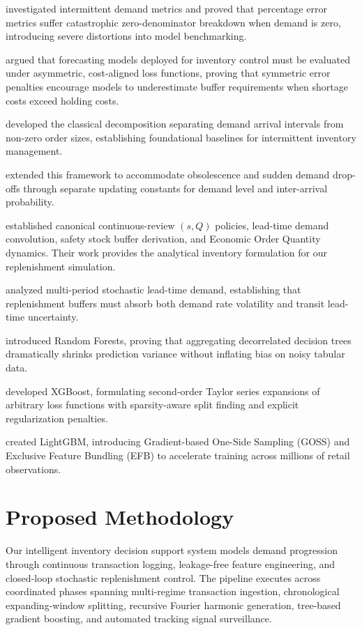 \documentclass[11pt,a4paper]{article}
\begin{document}
\cite{wallstrom2010evaluation} investigated intermittent demand metrics and proved that percentage error metrics suffer catastrophic zero-denominator breakdown when demand is zero, introducing severe distortions into model benchmarking.

\cite{kolassa2016evaluating} argued that forecasting models deployed for inventory control must be evaluated under asymmetric, cost-aligned loss functions, proving that symmetric error penalties encourage models to underestimate buffer requirements when shortage costs exceed holding costs.

\cite{croston1972forecasting} developed the classical decomposition separating demand arrival intervals from non-zero order sizes, establishing foundational baselines for intermittent inventory management.

\cite{teunter2011intermittent} extended this framework to accommodate obsolescence and sudden demand drop-offs through separate updating constants for demand level and inter-arrival probability.

\cite{silver1998inventory} established canonical continuous-review $(s, Q)$ policies, lead-time demand convolution, safety stock buffer derivation, and Economic Order Quantity dynamics. Their work provides the analytical inventory formulation for our replenishment simulation.

\cite{eppen1988determining} analyzed multi-period stochastic lead-time demand, establishing that replenishment buffers must absorb both demand rate volatility and transit lead-time uncertainty.

\cite{breiman2001random} introduced Random Forests, proving that aggregating decorrelated decision trees dramatically shrinks prediction variance without inflating bias on noisy tabular data.

\cite{chen2016xgboost} developed XGBoost, formulating second-order Taylor series expansions of arbitrary loss functions with sparsity-aware split finding and explicit regularization penalties.

\cite{ke2017lightgbm} created LightGBM, introducing Gradient-based One-Side Sampling (GOSS) and Exclusive Feature Bundling (EFB) to accelerate training across millions of retail observations.

\section{Proposed Methodology}
Our intelligent inventory decision support system models demand progression through continuous transaction logging, leakage-free feature engineering, and closed-loop stochastic replenishment control. The pipeline executes across coordinated phases spanning multi-regime transaction ingestion, chronological expanding-window splitting, recursive Fourier harmonic generation, tree-based gradient boosting, and automated tracking signal surveillance.
\end{document}
